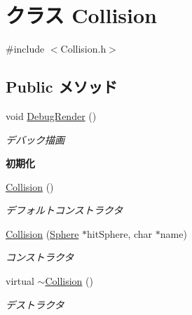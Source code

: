 \hypertarget{class_collision}{\section{クラス Collision}
\label{class_collision}
}


{\ttfamily \#include $<$Collision.\-h$>$}

\subsection*{Public メソッド}
\begin{DoxyCompactItemize}
\item 
void \hyperlink{class_collision_ae4c30e7064c9cb4f9fdb242b96ae9580}{Debug\-Render} ()
\begin{DoxyCompactList}\small\item\em デバック描画 \end{DoxyCompactList}\end{DoxyCompactItemize}
\begin{Indent}{\bf 初期化}\par
\begin{DoxyCompactItemize}
\item 
\hyperlink{class_collision_aea8004fbf48b79b5db7b784688b23788}{Collision} ()
\begin{DoxyCompactList}\small\item\em デフォルトコンストラクタ \end{DoxyCompactList}\item 
\hyperlink{class_collision_a67bb01ed29ce67e61d82819872072e5e}{Collision} (\hyperlink{struct_sphere}{Sphere} $\ast$hit\-Sphere, char $\ast$name)
\begin{DoxyCompactList}\small\item\em コンストラクタ \end{DoxyCompactList}\item 
virtual \hyperlink{class_collision_a19ae49bcb3b16f4622443a34a171590c}{$\sim$\-Collision} ()
\begin{DoxyCompactList}\small\item\em デストラクタ \end{DoxyCompactList}\end{DoxyCompactItemize}
\end{Indent}
